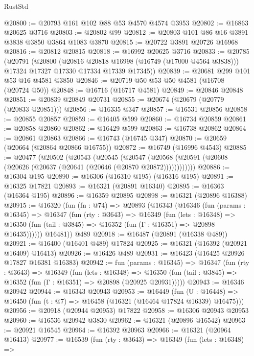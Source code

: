 \begin{lexlean}{RustStd}
\begin{coremodule}
@20800 := @20793 @161 @102 @88 @53 @4570 @4574 @3953
@20802 := @16863 @20625 @3716
@20803 := @20802 @99
@20812 := @20803 @101 @86 @16 @3891 @3838 @3850 @3864 @1083 @3870
@20815 := @20722 @3891 @20726 @16968
@20816 := @20812 @20815
@20818 := @16992 @20625 @3716
@20833 := @20785
    (@20791
      (@20800
        (@20816 @20818 @16998 (@16749 (@17000 @4564 @3838)))
        @17324
        @17327
        @17330
        @17334
        @17339
        @17345))
@20839 := @20681 @299 @101 @53 @16 @4581 @3850
@20846 := @20719 @50 @53 @50 @4581 (@16708 (@20724 @50))
@20848 := @16716 (@16717 @4581)
@20849 := @20846 @20848
@20851 := @20839 @20849 @20731
@20855 := @20674 (@20679 (@20779 (@20833 @20851)))
@20856 := @16335 @347
@20857 := @16531 @20856
@20858 := @20855 @20857
@20859 := @16405 @599
@20860 := @16734 @20859
@20861 := @20858 @20860
@20862 := @16429 @599
@20863 := @16738 @20862
@20864 := @20861 @20863
@20866 := @16743 (@16745 @347)
@20870 := @20659 (@20664 (@20864 @20866 @16755))
@20872 := @16749 (@16996 @4543)
@20885 := @20477
    (@20502
      (@20543
        (@20545
          (@20547 (@20568 (@20591 (@20608 (@20626 (@20637 (@20641 (@20646 (@20870 @20872))))))))))))
@20886 := @16304 @195
@20890 := @16306 (@16310 @195) (@16316 @195)
@20891 := @16325 @17821
@20893 := @16321 (@20891 @16340)
@20895 := @16363 (@16364 @195)
@20896 := @16359 @20895
@20898 := @16321 (@20896 @16388)
@20915 := @16320
    (fun (fn : @74) =>
    @20893
      (@16343
        (@16346
          (fun (params : @16345) =>
          @16347
            (fun (rty : @3643) =>
            @16349
              (fun (lets : @16348) =>
              @16350 (fun (tail : @3845) => @16352 (fun (Γ : @16351) => @20898 @16435))))))
        @16481))
    @489
@20918 := @16487 (@20891 (@16338 @489))
@20921 := @16400 (@16401 @489) @17824
@20925 := @16321 (@16392 (@20921 @16409) @16413)
@20926 := @16426 @489
@20931 := @16423 (@16425 @20926 @17827 @16381 @16383)
@20942 := fun (params : @16345) =>
  @16347
    (fun (rty : @3643) =>
    @16349
      (fun (lets : @16348) =>
      @16350 (fun (tail : @3845) => @16352 (fun (Γ : @16351) => @20898 (@20925 @20931)))))
@20943 := @16346 @20942
@20944 := @16343 @20943
@20953 := @16449
    (fun (U : @16448) => @16450 (fun (t : @7) => @16458 (@16321 (@16464 @17824 @16339) @16475)))
@20956 := @20918 (@20944 @20953) @17822
@20958 := @16306 @20943 @20953
@20960 := @16536 @20942 @3830
@20962 := @16321 (@20896 @16542)
@20963 := @20921 @16545
@20964 := @16392 @20963
@20966 := @16321 (@20964 @16413)
@20977 := @16539
    (fun (rty : @3643) =>
    @16349
      (fun (lets : @16348) =>

\end{coremodule}
\end{lexlean}

